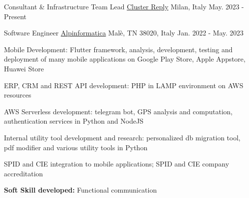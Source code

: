 

\begin{cventries}

  \cventry
    {Consultant \& Infrastructure Team Lead} %
    {\href{https://www.reply.com/cluster-reply/}{Cluster Reply}} %
    {Milan, Italy} %
    {May. 2023 - Present} %
    {
    }

  \cventry
    {Software Engineer} %
    {\href{https://www.alpinformatica.com/}{Alpinformatica}} %
    {Malè, TN 38020, Italy} %
    {Jan. 2022 - May. 2023} %
    {
      \begin{cvitems} %
        \item {Mobile Development: Flutter framework, analysis, development, testing and deployment of many mobile applications on Google Play Store, Apple Appstore, Huawei Store }
        \item {ERP, CRM and REST API development: PHP in LAMP environment on AWS resources}
        \item {AWS Serverless development: telegram bot, GPS analysis and computation, authentication services in Python and NodeJS}
        \item {Internal utility tool development and research: personalized db migration tool, pdf modifier and various utility tools in Python}
        \item {SPID and CIE integration to mobile applications; SPID and CIE company accreditation}
        \item {\textbf{Soft Skill developed:} Functional communication}
      \end{cvitems}
    }


\end{cventries}
